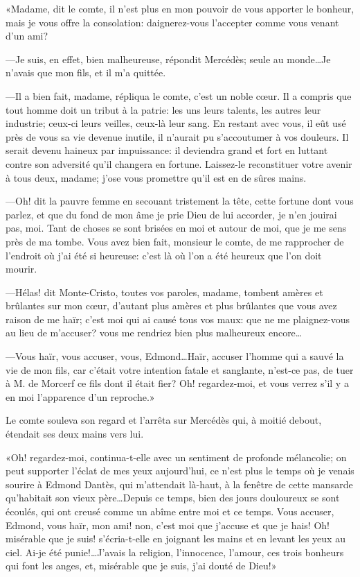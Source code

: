 «Madame, dit le comte, il n'est plus en mon pouvoir de vous apporter le bonheur, mais je vous offre la consolation: daignerez-vous l'accepter comme vous venant d'un ami? 

—Je suis, en effet, bien malheureuse, répondit Mercédès; seule au monde\dots Je n'avais que mon fils, et il m'a quittée. 

—Il a bien fait, madame, répliqua le comte, c'est un noble cœur. Il a compris que tout homme doit un tribut à la patrie: les uns leurs talents, les autres leur industrie; ceux-ci leurs veilles, ceux-là leur sang. En restant avec vous, il eût usé près de vous sa vie devenue inutile, il n'aurait pu s'accoutumer à vos douleurs. Il serait devenu haineux par impuissance: il deviendra grand et fort en luttant contre son adversité qu'il changera en fortune. Laissez-le reconstituer votre avenir à tous deux, madame; j'ose vous promettre qu'il est en de sûres mains. 

—Oh! dit la pauvre femme en secouant tristement la tête, cette fortune dont vous parlez, et que du fond de mon âme je prie Dieu de lui accorder, je n'en jouirai pas, moi. Tant de choses se sont brisées en moi et autour de moi, que je me sens près de ma tombe. Vous avez bien fait, monsieur le comte, de me rapprocher de l'endroit où j'ai été si heureuse: c'est là où l'on a été heureux que l'on doit mourir. 

—Hélas! dit Monte-Cristo, toutes vos paroles, madame, tombent amères et brûlantes sur mon cœur, d'autant plus amères et plus brûlantes que vous avez raison de me haïr; c'est moi qui ai causé tous vos maux: que ne me plaignez-vous au lieu de m'accuser? vous me rendriez bien plus malheureux encore\dots 

—Vous haïr, vous accuser, vous, Edmond\dots Haïr, accuser l'homme qui a sauvé la vie de mon fils, car c'était votre intention fatale et sanglante, n'est-ce pas, de tuer à M. de Morcerf ce fils dont il était fier? Oh! regardez-moi, et vous verrez s'il y a en moi l'apparence d'un reproche.» 

Le comte souleva son regard et l'arrêta sur Mercédès qui, à moitié debout, étendait ses deux mains vers lui. 

«Oh! regardez-moi, continua-t-elle avec un sentiment de profonde mélancolie; on peut supporter l'éclat de mes yeux aujourd'hui, ce n'est plus le temps où je venais sourire à Edmond Dantès, qui m'attendait là-haut, à la fenêtre de cette mansarde qu'habitait son vieux père\dots Depuis ce temps, bien des jours douloureux se sont écoulés, qui ont creusé comme un abîme entre moi et ce temps. Vous accuser, Edmond, vous haïr, mon ami! non, c'est moi que j'accuse et que je hais! Oh! misérable que je suis! s'écria-t-elle en joignant les mains et en levant les yeux au ciel. Ai-je été punie!\dots J'avais la religion, l'innocence, l'amour, ces trois bonheurs qui font les anges, et, misérable que je suis, j'ai douté de Dieu!» 

